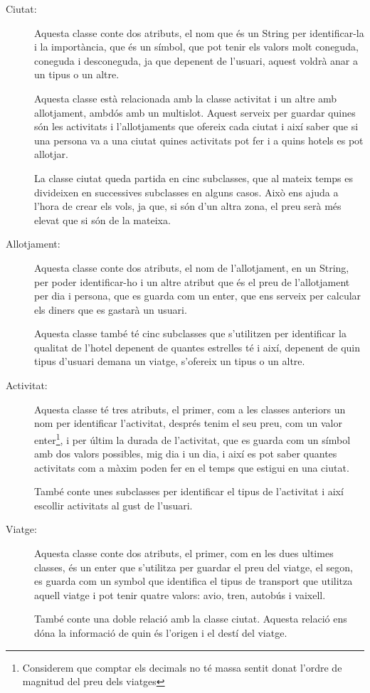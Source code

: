 \documentclass[11pt,a4paper]{article}
\begin{document}
\begin{description}
\item[Ciutat:]Aquesta classe conte dos atributs, el nom que és un String per identificar-la i la importància, que és un símbol, que pot tenir els valors molt coneguda, coneguda i desconeguda, ja que depenent de l'usuari, aquest voldrà anar a un tipus o un altre.

Aquesta classe està relacionada amb la classe activitat i un altre amb allotjament, ambdós amb un multislot. Aquest serveix per guardar quines són les activitats i l'allotjaments que ofereix cada ciutat i així saber que si una persona va a una ciutat quines activitats pot fer i a quins hotels es pot allotjar.

La classe ciutat queda partida en cinc subclasses, que al mateix temps es divideixen en successives subclasses en alguns casos. Això ens ajuda a l'hora de crear els vols, ja que, si són d'un altra zona, el preu serà més elevat que si són de la mateixa.

\item[Allotjament:] Aquesta classe conte dos atributs, el nom de l'allotjament, en un String, per poder identificar-ho i un altre atribut que és el preu de l'allotjament per dia i persona, que es guarda com un enter, que ens serveix per calcular els diners que es gastarà un usuari.

Aquesta classe també té cinc subclasses que s'utilitzen per identificar la qualitat de l'hotel depenent de quantes estrelles té i així, depenent de quin tipus d'usuari demana un viatge, s'ofereix un tipus o un altre.

\item[Activitat:] Aquesta classe té tres atributs, el primer, com a les classes anteriors un nom per identificar l'activitat, després tenim el seu preu, com un valor enter\footnote{Considerem que comptar els decimals no té massa sentit donat l'ordre de magnitud del preu dels viatges}, i per últim la durada de l'activitat, que es guarda com un símbol amb dos valors possibles, mig dia i un dia, i així es pot saber quantes activitats com a màxim poden fer en el temps que estigui en una ciutat.

També conte unes subclasses per identificar el tipus de l'activitat i així escollir activitats al gust de l'usuari.


\item[Viatge:] Aquesta classe conte dos atributs, el primer, com en les dues ultimes classes, és un enter que s'utilitza per guardar el preu del viatge, el segon, es guarda com un symbol que identifica el tipus de transport que utilitza aquell viatge i pot tenir quatre valors: avio, tren, autobús i vaixell.

També conte una doble relació amb la classe ciutat. Aquesta relació ens dóna la informació de quin és l'origen i el destí del viatge.
\end{description}
\end{document}
